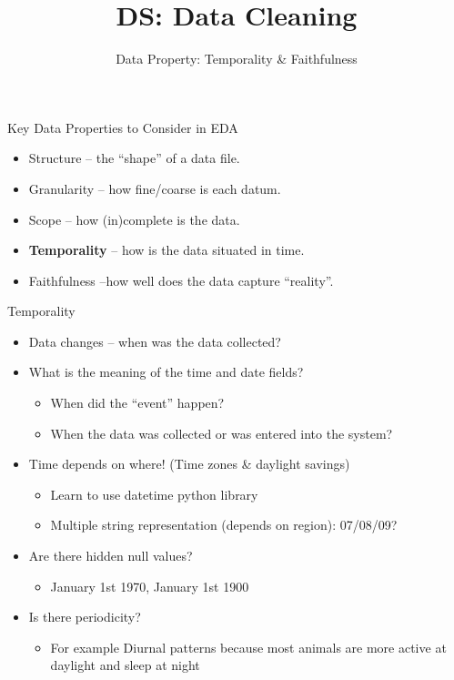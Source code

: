 \documentclass[aspectratio=169]{../latex_main/tntbeamer}  %
\title[Data Property: Temporality \& Faithfulness]{DS: Data Cleaning}
\subtitle{Data Property: Temporality \& Faithfulness}
\begin{document}
	
	\maketitle
 
\begin{frame}[c]{Key Data Properties to Consider in EDA}
    \begin{itemize}
        \item {Structure} -- the “shape” of a data file.
        \item {Granularity} -- how fine/coarse is each datum.
        \item {Scope} -- how (in)complete is the data.
        \item \textbf{Temporality} -- how is the data situated in time.
        \item {Faithfulness} --how well does the data capture “reality”.
    \end{itemize}
\end{frame}


\begin{frame}[c]{Temporality}

    \begin{itemize}
        \item Data changes – when was the data collected?
        \item What is the meaning of the time and date fields?
        \begin{itemize}
            \item When did the “event” happen?
            \item When the data was collected or was entered into the system?
        \end{itemize}
        \pause
        \item Time depends on where! (Time zones \& daylight savings)
        \begin{itemize}
            \item Learn to use datetime python library
            \item Multiple string representation (depends on region): 07/08/09?
        \end{itemize}
        \pause
        \item Are there hidden null values?
        \begin{itemize}
            \item January 1st 1970, January 1st 1900
        \end{itemize}
        \pause
        \item Is there periodicity? 
        \begin{itemize}
            \item For example Diurnal patterns because most animals are more active at daylight and sleep at night
        \end{itemize}
    \end{itemize}
    
\end{frame}
\end{document}
